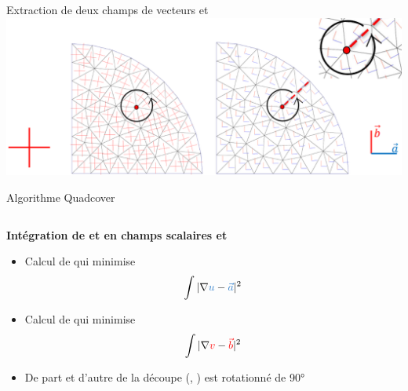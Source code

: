 \begin{frame}{Extraction de deux champs de vecteurs  et }
    \centering
    \includegraphics[width=\linewidth]{img/new_images/ff_to_vf.png}
\end{frame}

\begin{frame}{Algorithme Quadcover}
    \begin{columns}
        \begin{column}{0.5\textwidth}
            \textbf{Intégration de  et  en champs scalaires  et  }
            \begin{itemize}
                \item Calcul de  qui minimise \[\int{ |\nabla{\blue{u}} - \blue{\vec{a}}|^2 }\]
                \item Calcul de  qui minimise \[\int{ |\nabla{{\color{red}v}} - {\color{red}\vec{b}}|^2 }\]
                \item De part et d'autre de la découpe (, ) est rotationné de 90°
            \end{itemize}
        \end{column}
        

\end{columns}
\end{frame}
